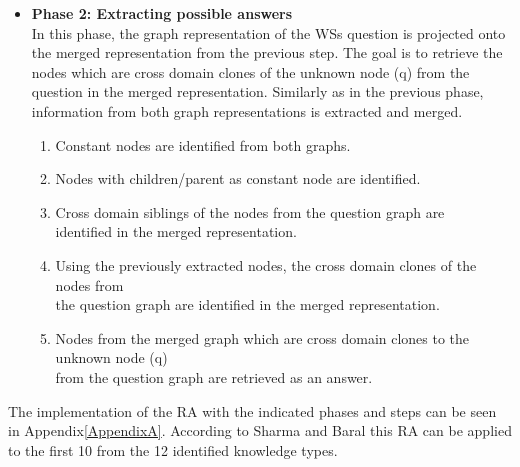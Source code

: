 \begin{itemize}
	\item \textbf{Phase 2: Extracting possible answers}\\
	In this phase, the graph representation of the WSs question is projected onto the merged representation from the previous step. The goal is to retrieve the nodes which are cross domain clones of the unknown node (q) from the question in the merged representation. Similarly as in the previous phase, information from both graph representations is extracted and merged.
	\begin{enumerate}
		\item Constant nodes are identified from both graphs.
		\item Nodes with children/parent as constant node are identified. 
		\item Cross domain siblings of the nodes from the question graph are \\ identified in the merged representation.
		\item Using the previously extracted nodes, the cross domain clones of the nodes from\\ the question graph are identified in the merged representation.
		\item Nodes from the merged graph which are cross domain clones to the unknown node (q)\\ from the question graph are retrieved as an answer.
	\end{enumerate}
\end{itemize}

The implementation of the RA with the indicated phases and steps can be seen in Appendix\ref{AppendixA}. 
According to Sharma and Baral \cite{2018CommonsenseKT} this RA can be applied to the first 10 from the 12 identified knowledge types. 

